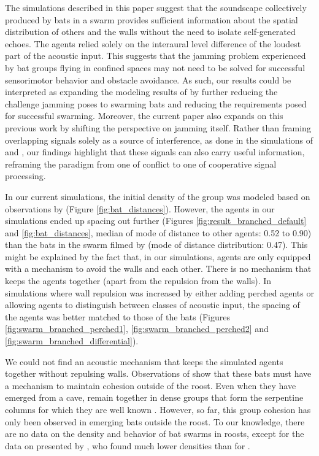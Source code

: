 \documentclass[a4paper, 11pt]{article}
\begin{document}
The simulations described in this paper suggest that the soundscape collectively produced by bats in a swarm provides sufficient information about the spatial distribution of others and the walls without the need to isolate self-generated echoes. The agents relied solely on the interaural level difference of the loudest part of the acoustic input. This suggests that the jamming problem experienced by bat groups flying in confined spaces may not need to be solved for successful sensorimotor behavior and obstacle avoidance. As such, our results could be interpreted as expanding the modeling results of \citet{Mazar2020,Mazar2024} by further reducing the challenge jamming poses to swarming bats and reducing the requirements posed for successful swarming. Moreover, the current paper also expands on this previous work by shifting the perspective on jamming itself. Rather than framing overlapping signals solely as a source of interference, as done in the simulations of \citet{Mazar2024} and \citet{Beyeler2009}, our findings highlight that these signals can also carry useful information, reframing the paradigm from one of conflict to one of cooperative signal processing.


In our current simulations, the initial density of the group was modeled based on observations by \citet{Weesner2023} (Figure \ref{fig:bat_distances}). However, the agents in our simulations ended up spacing out further (Figures \ref{fig:result_branched_default} and \ref{fig:bat_distances}, median of mode of distance to other agents: 0.52 to 0.90) than the bats in the swarm filmed by \citet{Weesner2023} (mode of distance distribution: 0.47). This might be explained by the fact that, in our simulations, agents are only equipped with a mechanism to avoid the walls and each other. There is no mechanism that keeps the agents together (apart from the repulsion from the walls). In simulations where wall repulsion was increased by either adding perched agents or allowing agents to distinguish between classes of acoustic input, the spacing of the agents was better matched to those of the bats (Figures \ref{fig:swarm_branched_perched1}, \ref{fig:swarm_branched_perched2}  and \ref{fig:swarm_branched_differential}). 

We could not find an acoustic mechanism that keeps the simulated agents together without repulsing walls. Observations of  show that these bats must have a mechanism to maintain cohesion outside of the roost. Even when they have emerged from a cave,  remain together in dense groups that form the serpentine columns for which they are well known \citep{Wilkins1989,Gillam2010}. However, so far, this group cohesion has only been observed in emerging bats outside the roost. To our knowledge, there are no data on the density and behavior of bat swarms in roosts, except for the data on  presented by \citet{Lin2016}, who found much lower densities than \citet{Weesner2023} for .
\end{document}
